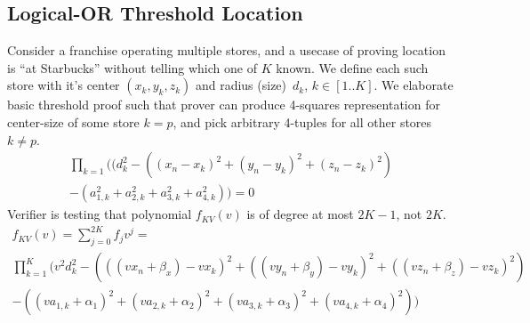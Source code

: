 \documentclass{article}
\begin{document}
\subsection{Logical-OR Threshold Location}

Consider a franchise operating multiple stores,
and a usecase of proving location is ``at Starbucks'' without telling which one of $K$ known.
We define each such store with it's center $(x_k, y_k, z_k)$ and radius (size)~$d_k$, $k \in [1 .. K]$.
We elaborate basic threshold proof such that prover can produce
4-squares representation for center-size of some store $k=p$,
and pick arbitrary 4-tuples for all other stores $k \ne p$.
\begin{multline}
\label{eq-distn-or}
\prod_{k=1}
((d_k^2 - ((x_n - x_k)^2 + (y_n - y_k)^2 + (z_n - z_k)^2) \\
- (a_{1, k}^2 + a_{2, k}^2 + a_{3, k}^2 + a_{4, k}^2)) = 0
\end{multline}
Verifier is testing that polynomial $f_{KV}(v)$ is of degree at most $2K-1$, not $2K$.
\begin{multline}
f_{KV}(v) = \sum_{j=0}^{2K} f_j v^j = \\
\prod_{k=1}^{K} (
v^2 d_k^2 - (((v x_n + \beta_x) - v x_k)^2 +
((v y_n + \beta_y) - v y_k)^2 +
((v z_n + \beta_z) - v z_k)^2)  \\
- ((v a_{1,k} + \alpha_1)^2 +
(v a_{2,k} + \alpha_2)^2 +
(v a_{3,k} + \alpha_3)^2 +
(v a_{4,k} + \alpha_4)^2) )
\end{multline}



% 


\end{document}
